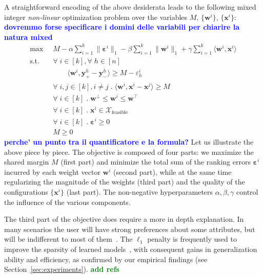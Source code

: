 \documentclass{article}
\renewcommand\[{\begin{equation}}
\renewcommand\]{\end{equation}}
\newcommand{\calvar}[1]{\ensuremath{\mathcal{#1}}}
\newcommand{\calX}{\calvar{X}}
\newcommand{\vecvar}[1]{\ensuremath{\boldsymbol{#1}}}
\newcommand{\vw}{\vecvar{w}}
\newcommand{\vx}{\vecvar{x}}
\newcommand{\vy}{\vecvar{y}}
\newcommand{\veps}{\vecvar{\varepsilon}}
\newcommand{\andrea}[1]{{\bf \textcolor{blue}{{\fbox{Andrea:} #1}}}}
\newcommand{\stefano}[1]{{\bf \textcolor{green}{{\fbox{Stefano:} #1}}}}
\begin{document}
A straightforward encoding of the above desiderata leads to the
following mixed integer {\em non-linear} optimization problem over the
variables $M$, $\{ \vw^i \}$, $\{ \vx^i \}$: \andrea{dovremmo forse specificare i domini delle variabili per chiarire la natura mixed}
%
{\footnotesize
\begin{align}
    \max
        & \;\; M - \alpha \sum_{i=1}^k \| \veps^{i} \|_1 - \beta \sum_{i=1}^k \| \vw^{i} \|_1 + \gamma \sum_{i=1}^k \langle \vw^{i}, \vx^{i} \rangle
        \nonumber
    \\
    \text{s.t.}
        & \;\; \forall \; i \in [k], \forall \; h \in [n] \nonumber
    \\
        & \;\; \qquad \langle \vw^{i}, \vy^{h}_+ - \vy^{h}_- \rangle \ge M - \varepsilon^{i}_h \label{eq:wyconstr}
    \\
        & \;\; \forall \; i, j \in [k], i \neq j \;.\; \langle \vw^{i}, \vx^{i} - \vx^{j} \rangle \ge M \label{eq:wxconstr}
    \\
        & \;\; \forall \; i \in [k] \;.\; \vw^\bot \le \vw^{i} \le \vw^\top \label{eq:wbounds}
    \\
        & \;\; \forall \; i \in [k] \;.\; \vx^{i} \in \calX_{\text{feasible}} \label{eq:xbounds}
    \\
        & \;\; \forall \; i \in [k] \;.\; \veps^{i} \ge 0 \nonumber
    \\
        & \;\; M \ge 0 \nonumber
\end{align}
} \andrea{perche' un punto tra il quantificatore e la formula?}
%
Let us illustrate the above piece by piece. The objective is composed of four
parts: we maximize the shared margin $M$ (first part) and minimize the total
sum of the ranking errors $\veps^i$ incurred by each weight vector $\vw^{i}$
(second part), while at the same time regularizing the magnitude of the
weights (third part) and the quality of the configurations $\{ \vx^{i} \}$ (last
part). The non-negative hyperparameters $\alpha,\beta,\gamma$ control the
influence of the various components.

The third part of the objective does require a more in depth explanation. In
many scenarios the user will have strong preferences about some attributes, but
will be indifferent to most of them~\cite{}. The $\ell_1$ penalty is frequently
used to improve the sparsity of learned models~\cite{lasso}, with consequent gains
in generalization ability and efficiency, as confirmed by our empirical
findings (see Section~\ref{sec:experiments}). \stefano{add refs}
\end{document}
